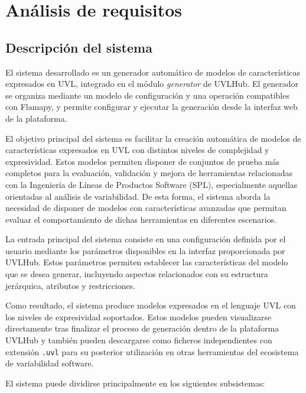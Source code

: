 \chapter{Análisis de requisitos}
\label{chap:requisitos}


\section{Descripción del sistema}
\label{sec:descripcion_sistema}

El sistema desarrollado es un generador automático de modelos de
características expresados en UVL, integrado en el módulo
\textit{generator} de UVLHub. El generador se organiza mediante un
modelo de configuración y una operación compatibles con Flamapy, y
permite configurar y ejecutar la generación desde la interfaz web de
la plataforma.

El objetivo principal del sistema es facilitar la creación automática de modelos de características expresados en UVL con distintos niveles de complejidad y expresividad. Estos modelos permiten disponer de conjuntos de prueba más completos para la evaluación, validación y mejora de herramientas relacionadas con la Ingeniería de Líneas de Productos Software (SPL), especialmente aquellas orientadas al análisis de variabilidad. De esta forma, el sistema aborda la necesidad de disponer de modelos con características avanzadas que permitan evaluar el comportamiento de dichas herramientas en diferentes escenarios.

La entrada principal del sistema consiste en una configuración definida por el usuario mediante los parámetros disponibles en la interfaz proporcionada por UVLHub. Estos parámetros permiten establecer las características del modelo que se desea generar, incluyendo aspectos relacionados con su estructura jerárquica, atributos y restricciones.

Como resultado, el sistema produce modelos expresados en el lenguaje UVL con los niveles de expresividad soportados. Estos modelos pueden visualizarse directamente tras finalizar el proceso de generación dentro de la plataforma UVLHub y también pueden descargarse como ficheros independientes con extensión \texttt{.uvl} para su posterior utilización en otras herramientas del ecosistema de variabilidad software.

El sistema puede dividirse principalmente en los siguientes subsistemas:

